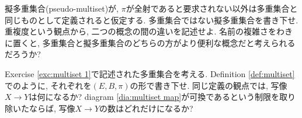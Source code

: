 \begin{exercise}
擬多重集合(pseudo-multiset)が, $\pi$が全射であると要求されない以外は多重集合と同じものとして定義されると仮定する.
\sexc 多重集合ではない擬多重集合を書き下せ.
\next 重複度という観点から, 二つの概念の間の違いを記述せよ.
\next 名前の複雑さをわきに置くと, 多重集合と擬多重集合のどちらの方がより便利な概念だと考えられるだろうか?
\endsexc
\end{exercise}

\begin{exercise}
Exercise \ref{exc:multiset 1}で記述された多重集合を考える.
\sexc Definition \ref{def:multiset}でのように, それぞれを$(E,B,\pi)$の形で書き下せ.
\next 同じ定義の観点では, 写像$X\to Y$は何になるか?
\next diagram \ref{dia:multiset map}が可換であるという制限を取り除いたならば, 写像$X\to Y$の数はどれだけになるか?
\endsexc
\end{exercise}

